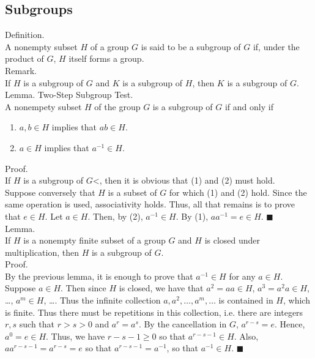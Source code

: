 \documentclass[twocolumn]{article}
\newcommand{\qed}{$\blacksquare$}
\begin{document}
\subsection{Subgroups}

Definition. \\
A nonempty subset $H$ of a group $G$ is said to be a subgroup of $G$ if, under the product of $G$, $H$ itself forms a group. \\

Remark. \\
If $H$ is a subgroup of $G$ and $K$ is a subgroup of $H$, then $K$ is a subgroup of $G$. \\

Lemma. Two-Step Subgroup Test. \\
A nonempety subset $H$ of the group $G$ is a subgroup of $G$ if and only if
\begin{enumerate}
	\item
	$a, b \in H$ implies that $ab \in H$.
	\item
	$a \in H$ implies that $a^{-1} \in H$.
\end{enumerate}
Proof. \\
If $H$ is a subgroup of $G$<, then it is obvious that (1) and (2) must hold. \\
Suppose conversely that $H$ is a subset of $G$ for which (1) and (2) hold. Since the same operation is used, associativity holds. Thus, all that remains is to prove that $e \in H$. Let $a \in H$. Then, by (2), $a^{-1} \in H$. By (1), $aa^{-1} = e \in H$. \qed \\

Lemma. \\
If $H$ is a nonempty finite subset of a group $G$ and $H$ is closed under multiplication, then $H$ is a subgroup of $G$. \\
Proof. \\
By the previous lemma, it is enough to prove that $a^{-1} \in H$ for any $a \in H$. Suppose $a \in H$. Then since $H$ is closed, we have that $a^2 = aa \in H$, $a^3 = a^2a \in H$, \ldots, $a^m \in H$, \ldots. Thus the infinite collection $a, a^2, \ldots, a^m, \ldots$ is contained in $H$, which is finite. Thus there must be repetitions in this collection, i.e. there are integers $r, s$ such that $r > s > 0$ and $a^r = a^s$. By the cancellation in $G$, $a^{r - s} = e$.
Hence, $a^0 = e \in H$. Thus, we have $r - s - 1 \geq 0$ so that $a^{r - s - 1} \in H$. Also, $aa^{r - s - 1} = a^{r - s} = e$ so that $a^{r - s - 1} = a^{-1}$, so that $a^{-1} \in H$. \qed \\
\end{document}
